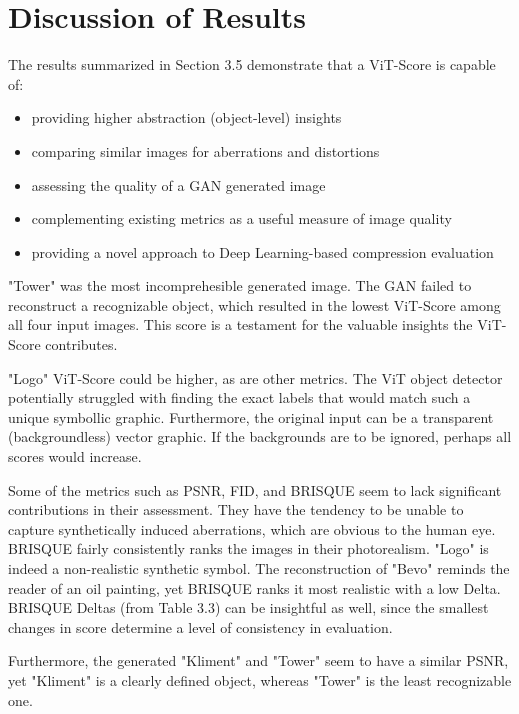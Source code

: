 \section{Discussion of Results}

The results summarized in Section 3.5 demonstrate that a ViT-Score is capable of:

\begin{itemize}
    \item providing higher abstraction (object-level) insights
    \item comparing similar images for aberrations and distortions
	\item assessing the quality of a GAN generated image 
    \item complementing existing metrics as a useful measure of image quality
    \item providing a novel approach to Deep Learning-based compression evaluation
\end{itemize} 

"Tower" was the most incomprehesible generated image. The GAN failed to reconstruct a recognizable
object, which resulted in the lowest ViT-Score among all four input images. 
This score is a testament for the valuable insights the ViT-Score contributes.


"Logo" ViT-Score could be higher, as are other metrics. The ViT object detector potentially struggled with 
finding the exact labels that would match such a unique symbollic graphic.
Furthermore, the original input can be a transparent (backgroundless) vector graphic. 
If the backgrounds are to be ignored, perhaps all scores would increase.


Some of the metrics such as PSNR, FID, and BRISQUE seem to lack significant contributions in their assessment. They have the tendency 
to be unable to capture synthetically induced aberrations, which are obvious to the human eye.
BRISQUE fairly consistently ranks the images in their photorealism. "Logo" is indeed a non-realistic synthetic symbol.
The reconstruction of "Bevo" reminds the reader of an oil painting, yet BRISQUE ranks it most realistic with a low Delta.
BRISQUE Deltas (from Table 3.3) can be insightful as well, since the smallest changes in score determine a level of 
consistency in evaluation.

Furthermore, the generated "Kliment" and "Tower" seem to have a similar PSNR, yet "Kliment" is a clearly defined object, 
whereas "Tower" is the least recognizable one.


